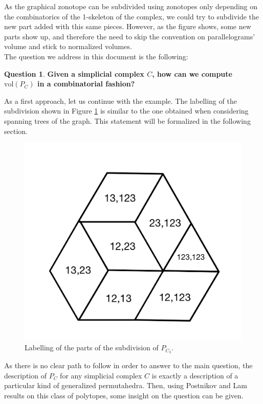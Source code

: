\documentclass[english,11pt]{article}
\theoremstyle{definition}
\theoremstyle{definition}
\theoremstyle{definition}
\theoremstyle{remark}
\theoremstyle{definition}
\newtheorem{question}{Question}[section]
\begin{document}
As the graphical zonotope can be subdivided using zonotopes only depending on the combinatorics of the 1-skeleton of the complex, we could try to subdivide the new part added with this same pieces. However, as the figure shows, some new parts show up, and therefore the need to skip the convention on parallelograms' volume and stick to normalized volumes.\\

The question we address in this document is the following:

\begin{question}
\textbf{Given a simplicial complex $C$, how can we compute $\text{vol}(P_C)$ in a combinatorial fashion? }
\end{question}

As a first approach, let us continue with the example. The labelling of the subdivision shown in Figure \ref{fig:P_C_3-sub-marked} is similar to the one obtained when considering spanning trees of the graph. This statement will be formalized in the following section. 

\begin{figure}[!]
    \centering
    \includegraphics[scale=0.16]{images/P_C_3-subdivision-marked.png}
    \caption{Labelling of the parts of the subdivision of $P_{C_3}$.}
    \label{fig:P_C_3-sub-marked}
\end{figure}

As there is no clear path to follow in order to answer to the main question, the description of $P_C$ for any simplicial complex $C$ is exactly a description of a particular kind of generalized permutahedra. Then, using Postnikov and Lam results on this class of polytopes, some insight on the question can be given. 
\end{document}
